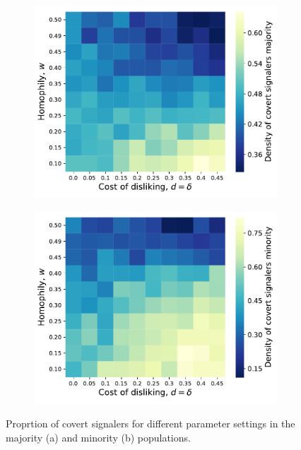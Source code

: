 \documentclass[11pt,letterpaper]{article}
\begin{document}
\begin{figure}[H]
  \centering
  \begin{subfigure}{0.49\textwidth}
    \centering
    \includegraphics[width=\textwidth]{prelim/Figures/majority_signalers_005.pdf}
    \caption{}
    \label{fig:}
  \end{subfigure}
  \begin{subfigure}{0.49\textwidth}
    \centering
    \includegraphics[width=\textwidth]{prelim/Figures/minority_signalers_005.pdf}
    \caption{}
    \label{fig:}
  \end{subfigure}
  \caption{Proprtion of covert signalers for different parameter settings in the
    majority (a) and minority (b) populations.}
  \label{fig:regressions}
\end{figure}
\end{document}
